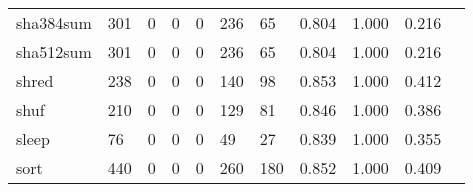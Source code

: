 \begin{longtable}{lp{1.2cm}p{1.2cm}p{1.2cm}p{1.2cm}p{1.2cm}p{1.2cm}p{1.2cm}p{1.2cm}p{1.2cm}p{1.2cm}}
sha384sum &                                   301 &                                                  0 &                                                  0 &                                                  0 &                                                236 &                                                 65 &                                              0.804 &                                              1.000 &                                              0.216 \\
sha512sum &                                   301 &                                                  0 &                                                  0 &                                                  0 &                                                236 &                                                 65 &                                              0.804 &                                              1.000 &                                              0.216 \\
shred     &                                   238 &                                                  0 &                                                  0 &                                                  0 &                                                140 &                                                 98 &                                              0.853 &                                              1.000 &                                              0.412 \\
shuf      &                                   210 &                                                  0 &                                                  0 &                                                  0 &                                                129 &                                                 81 &                                              0.846 &                                              1.000 &                                              0.386 \\
sleep     &                                    76 &                                                  0 &                                                  0 &                                                  0 &                                                 49 &                                                 27 &                                              0.839 &                                              1.000 &                                              0.355 \\
sort      &                                   440 &                                                  0 &                                                  0 &                                                  0 &                                                260 &                                                180 &                                              0.852 &                                              1.000 &                                              0.409 \\

\end{longtable}
